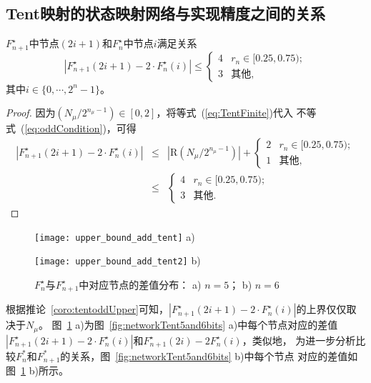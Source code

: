 \subsection{Tent映射的状态映射网络与实现精度之间的关系}

\begin{Corollary}
\label{coro:tentoddUpper}
$F^\star_{n+1}$中节点$(2i+1)$和$F^\star_{n}$中节点$i$满足关系
\begin{equation*}
\left|F^\star_{n+1}(2i+1)-2\cdot F^\star_n(i)\right|\le
\begin{cases}
4  & r_n \in [0.25, 0.75);\nonumber\\
3  & \mbox{其他},
\end{cases}
\end{equation*}
其中$i\in \{0, \cdots, 2^n-1\}$。
\end{Corollary}

\begin{proof}
因为$\left(N_{\mu}/2^{n_\mu-1}\right)\in[0,2]$，将等式~(\ref{eq:TentFinite})代入
不等式~(\ref{eq:oddCondition})，可得
\begin{eqnarray}
\left|F^\star_{n+1}(2i+1)-2\cdot F^\star_n(i)\right|
& \le & \left|\mathrm{R}\left(N_{\mu}/2^{n_\mu-1}\right)\right|+
\begin{cases}
2  & r_n \in [0.25, 0.75);\nonumber\\
1  & \mbox{其他},
\end{cases}\\
& \le  &
\begin{cases}
4  & r_n \in [0.25, 0.75);\nonumber\\
3  & \mbox{其他}.
\end{cases}
\end{eqnarray}\qedsymbol
\end{proof}

\begin{figure}[!htb]
\centering
\begin{minipage}{\TwoImW}
\centering
\texttt{[image: upper\_bound\_add\_tent]}
a)
\end{minipage}
\begin{minipage}{\TwoImW}
\centering
\texttt{[image: upper\_bound\_add\_tent2]}
b)
\end{minipage}
\caption{$F^\star_{n}$与$F^\star_{n+1}$中对应节点的差值分布： a) $n=5$； b) $n=6$}
\label{fig:upperboundtent}
\end{figure}

根据推论~\ref{coro:tentoddUpper}可知，$|F^\star_{n+1}(2i+1)-2\cdot F^\star_n(i)|$的上界仅仅取决于$N_{\mu}$。
图~\ref{fig:upperboundtent} a)为图~\ref{fig:networkTent5and6bits} a)中每个节点对应的差值
$|F^\star_{n+1}(2i+1)-2\cdot F^\star_n(i)|$和$F^\star_{n+1}(2i)-2F^\star_n(i)$，类似地，
为进一步分析比较$F^*_{n}$和$F^*_{n+1}$的关系，图~\ref{fig:networkTent5and6bits} b)中每个节点
对应的差值如图~\ref{fig:upperboundtent} b)所示。


